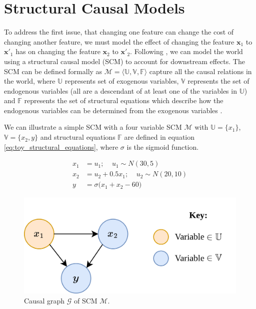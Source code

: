 \section{Structural Causal Models}

To address the first issue, that changing one feature can change the cost of changing another feature, we must model the effect of changing the feature $\mathbf{x}_1$ to $\mathbf{x'}_1$ has on changing the feature $\mathbf{x}_2$ to $\mathbf{x'}_2$. Following \textcite{karimiAlgorithmicRecourseCounterfactual2021}, we can model the world using a structural causal model (SCM) to account for downstream effects. The SCM can be defined formally as $\mathcal{M} = \langle\mathbb{U, V, F}\rangle$ capture all the causal relations in the world, where $\mathbb{U}$ represents set of exogenous variables, $\mathbb{V}$ represents the set of endogenous variables (all are a descendant of at least one of the variables in $\mathbb{U}$) and $\mathbb{F}$ represents the set of structural equations which describe how the endogenous variables can be determined from the exogenous variables \citep{pearl2016causal}.

We can illustrate a simple SCM with a four variable SCM $\mathcal{M}$ with $\mathbb{U} = \{x_1\}$, $\mathbb{V} = \{x_2, y\}$ and structural equations $\mathbb{F}$ are defined in equation \ref{eq:toy_structural_equations}, where $\sigma$ is the sigmoid function. 

\begin{align} \label{eq:toy_structural_equations}
	x_1 & = u_1; \;\;\;\; u_1 \sim N(30 , 5) \\ \nonumber
	x_2 & = u_2 + 0.5x_1; \;\;\;\; u_2 \sim N(20, 10) \\ \nonumber
	y & = \sigma \bigg(x_1 + x_2 - 60\bigg) \nonumber
\end{align}


\begin{figure}[!htb]
	\centering
	\includegraphics[width=0.6\linewidth]{images/draw.io/Simple SCM.png}
	\caption{Causal graph $\mathcal{G}$ of SCM $\mathcal{M}$.}
	\label{fig:toy_scm}
\end{figure}


